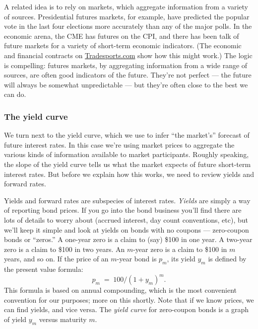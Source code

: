 \documentclass[letterpaper,12pt]{article}
\begin{document}
A related idea is to rely on markets, which aggregate information
from a variety of sources.  Presidential futures markets, for
example, have predicted the popular vote in the last four
elections more accurately than any of the major polls.  In the
economic arena, the CME has futures on the CPI, and there has been
talk of future markets for a variety of short-term economic
indicators. (The economic and financial contracts on
\href{http://www.tradesports.com/jsp/intrade/contractSearch/}{Tradesports.com}
show how this might work.)  The logic is compelling: futures
markets, by aggregating information from a wide range of sources,
are often good indicators of the future.  They're not perfect ---
the future will always be somewhat unpredictable
--- but they're often close to the best we can do.



\subsubsection*{The yield curve}


We turn next to the yield curve, which we use to infer ``the
market's'' forecast of future interest rates.  In this case we're
using market prices to aggregate the various kinds of information
available to market participants. Roughly speaking, the slope of
the yield curve tells us what the market expects of future
short-term interest rates. But before we explain how this works,
we need to review yields and forward rates.

Yields and forward rates are subspecies of interest rates. {\it
Yields\/} are simply a way of reporting bond prices. If you go
into the bond business you'll find there are lots of details to
worry about (accrued interest, day count conventions, etc), but
we'll keep it simple and look at yields on bonds with no coupons
--- zero-coupon bonds or ``zeros.''  A one-year zero is a claim to (say) \$100 in
one year.  A two-year zero is a claim to \$100 in two years.  An
$m$-year zero is a claim to \$100 in $m$ years, and so on.  If the
price of an $m$-year bond is $p_m$, its yield $y_m$ is defined by
the present value formula:
\begin{equation}
        p_m  \;=\; 100/(1+y_m)^m.
        \label{eq:pv}
\end{equation}
This formula is based on annual compounding, which is the most
convenient convention for our purposes; more on this shortly. Note
that if we know prices, we can find yields, and vice versa. The
{\it yield curve\/} for zero-coupon bonds is a graph of yield
$y_m$ versus maturity $m$.
\end{document}
